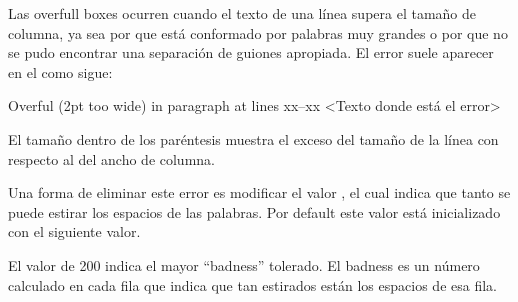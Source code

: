 Las overfull boxes ocurren cuando el texto de una línea supera el tamaño de columna, ya sea por que está conformado por palabras muy grandes o por que no se pudo encontrar una separación de guiones apropiada. El error suele aparecer en el  como sigue:
\begin{codeblock}
  Overful \hbox (2pt too wide) in paragraph at lines xx--xx
  <Texto donde está el error>
\end{codeblock}

El tamaño dentro de los paréntesis muestra el exceso del tamaño de la línea con respecto al del ancho de columna.

Una forma de eliminar este error es modificar el valor \texcs\tolerance, el cual indica que tanto se puede estirar los espacios de las palabras. Por default este valor está inicializado con el siguiente valor.
\begin{texcode}
\end{texcode}
El valor de 200 indica el mayor ``badness'' tolerado. El badness es un número calculado en cada fila que indica que tan estirados están los espacios de esa fila.
